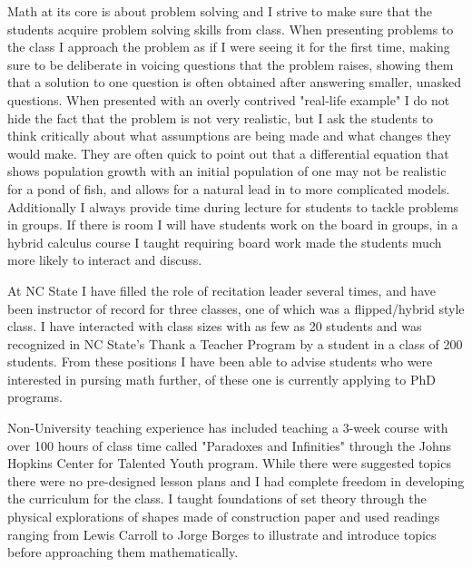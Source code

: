 \documentclass{article}[12pt]
\begin{document}
Math at its core is about problem solving and I strive to make sure that the students acquire problem solving skills from class.
When presenting problems to the class I approach the problem as if I were seeing it for the first time, making sure to be deliberate in voicing questions that the problem raises, showing them that a solution to one question is often obtained after answering smaller, unasked questions.
When presented with an overly contrived "real-life example" I do not hide the fact that the problem is not very realistic, but I ask the students to think critically about what assumptions are being made and what changes they would make.  They are often quick to point out that a differential equation that shows population growth with an initial population of one may not be realistic for a pond of fish, and allows for a natural lead in to more complicated models. 
Additionally I always provide time during lecture for students to tackle problems in groups.  If there is room I will have students work on the board in groups, in a hybrid calculus course I taught requiring board work made the students much more likely to interact and discuss.

At NC State I have filled the role of recitation leader several times, and have been instructor of record for three classes, one of which was a flipped/hybrid style class. I have interacted with class sizes with as few as 20 students and was recognized in NC State's Thank a Teacher Program by a student in a class of 200 students.
From these positions I have been able to advise students who were interested in pursing math further, of these one is currently applying to PhD programs.


Non-University teaching experience has included teaching a 3-week course with over 100 hours of class time called "Paradoxes and Infinities" through the Johns Hopkins Center for Talented Youth program.
While there were suggested topics there were no pre-designed lesson plans and I had complete freedom in developing the curriculum for the class. I taught foundations of set theory through the physical explorations of shapes made of construction paper and used readings ranging from Lewis Carroll to Jorge Borges to illustrate and introduce topics before approaching them mathematically.
\end{document}
